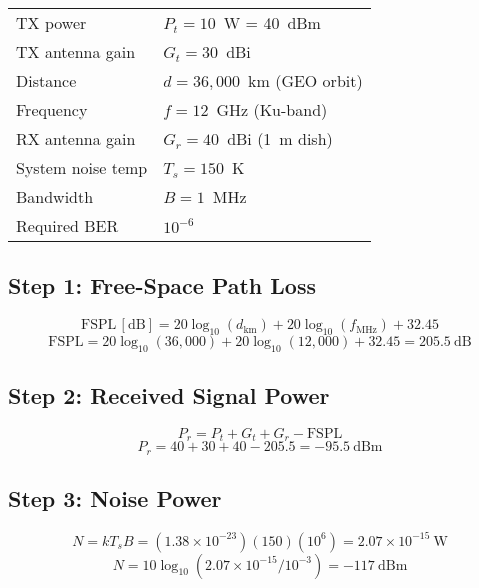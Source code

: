 \begin{tabular}{@{}ll@{}}
TX power & $P_t = 10$~W = 40~dBm \\
TX antenna gain & $G_t = 30$~dBi \\
Distance & $d = 36{,}000$~km (GEO orbit) \\
Frequency & $f = 12$~GHz (Ku-band) \\
RX antenna gain & $G_r = 40$~dBi (1~m dish) \\
System noise temp & $T_s = 150$~K \\
Bandwidth & $B = 1$~MHz \\
Required BER & $10^{-6}$ \\
\end{tabular}

\subsection*{Step 1: Free-Space Path Loss}

\begin{equation}
\mathrm{FSPL\,[dB]} = 20\log_{10}(d_{\text{km}}) + 20\log_{10}(f_{\text{MHz}}) + 32.45
\end{equation}
\begin{equation}
\mathrm{FSPL} = 20\log_{10}(36{,}000) + 20\log_{10}(12{,}000) + 32.45 = 205.5~\text{dB}
\end{equation}

\subsection*{Step 2: Received Signal Power}

\begin{equation}
P_r = P_t + G_t + G_r - \mathrm{FSPL}
\end{equation}
\begin{equation}
P_r = 40 + 30 + 40 - 205.5 = -95.5~\text{dBm}
\end{equation}

\subsection*{Step 3: Noise Power}

\begin{equation}
N = kT_sB = (1.38 \times 10^{-23})(150)(10^6) = 2.07 \times 10^{-15}~\text{W}
\end{equation}
\begin{equation}
N = 10\log_{10}(2.07 \times 10^{-15} / 10^{-3}) = -117~\text{dBm}
\end{equation}

